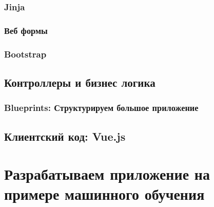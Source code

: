 \subsection{Jinja}

\subsection{Веб формы}

\subsection{Bootstrap}

\section{Контроллеры и бизнес логика}

\subsection{Blueprints: Структурируем большое приложение}

\section{Клиентский код: Vue.js}

\chapter{Разрабатываем приложение на примере машинного обучения}


